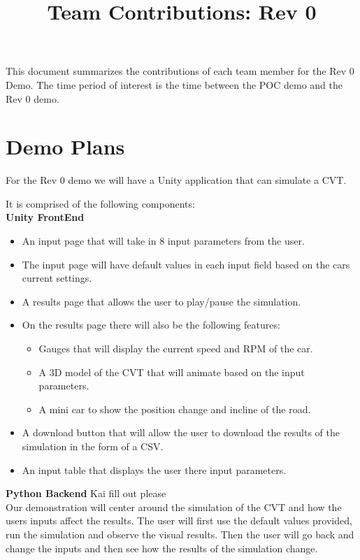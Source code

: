 \documentclass{article}
\title{Team Contributions: Rev 0\\\progname}
\author{\authname}
\date{}
\begin{document}
\maketitle

This document summarizes the contributions of each team member for the Rev 0
Demo.  The time period of interest is the time between the POC demo and the Rev
0 demo.

\section{Demo Plans}

For the Rev 0 demo we will have a Unity application that can simulate a CVT.

It is comprised of the following components:\\

\textbf{Unity FrontEnd}

\begin{itemize}
  \item An input page that will take in 8 input parameters from the user.
  \item The input page will have default values in each input field based on the cars current settings.
  \item A results page that allows the user to play/pause the simulation.
  \item On the results page there will also be the following features:
  \begin{itemize}
    \item Gauges that will display the current speed and RPM of the car.
    \item A 3D model of the CVT that will animate based on the input parameters.
    \item A mini car to show the position change and incline of the road.
  \end{itemize}
  \item A download button that will allow the user to download the results of the simulation in the form of a CSV.
  \item An input table that displays the user there input parameters.
\end{itemize}

\textbf{Python Backend}
Kai fill out please\\

Our demonstration will center around the simulation of the CVT and how the users inputs affect the results.
The user will first use the default values provided, run the simulation and observe the visual results.
Then the user will go back and change the inputs and then see how the results of the simulation change. 
\end{document}

